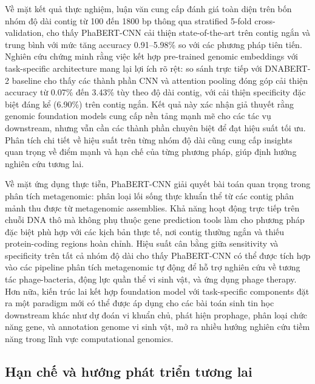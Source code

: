 Về mặt kết quả thực nghiệm, luận văn cung cấp đánh giá toàn diện trên bốn nhóm độ dài contig từ 100 đến 1800 bp thông qua stratified 5-fold cross-validation, cho thấy PhaBERT-CNN cải thiện state-of-the-art trên contig ngắn và trung bình với mức tăng accuracy 0.91--5.98\% so với các phương pháp tiên tiến. Nghiên cứu chứng minh rằng việc kết hợp pre-trained genomic embeddings với task-specific architecture mang lại lợi ích rõ rệt: so sánh trực tiếp với DNABERT-2 baseline cho thấy các thành phần CNN và attention pooling đóng góp cải thiện accuracy từ 0.07\% đến 3.43\% tùy theo độ dài contig, với cải thiện specificity đặc biệt đáng kể (6.90\%) trên contig ngắn. Kết quả này xác nhận giả thuyết rằng genomic foundation models cung cấp nền tảng mạnh mẽ cho các tác vụ downstream, nhưng vẫn cần các thành phần chuyên biệt để đạt hiệu suất tối ưu. Phân tích chi tiết về hiệu suất trên từng nhóm độ dài cũng cung cấp insights quan trọng về điểm mạnh và hạn chế của từng phương pháp, giúp định hướng nghiên cứu tương lai.

Về mặt ứng dụng thực tiễn, PhaBERT-CNN giải quyết bài toán quan trọng trong phân tích metagenomic: phân loại lối sống thực khuẩn thể từ các contig phân mảnh thu được từ metagenomic assemblies. Khả năng hoạt động trực tiếp trên chuỗi DNA thô mà không phụ thuộc gene prediction tools làm cho phương pháp đặc biệt phù hợp với các kịch bản thực tế, nơi contig thường ngắn và thiếu protein-coding regions hoàn chỉnh. Hiệu suất cân bằng giữa sensitivity và specificity trên tất cả nhóm độ dài cho thấy PhaBERT-CNN có thể được tích hợp vào các pipeline phân tích metagenomic tự động để hỗ trợ nghiên cứu về tương tác phage-bacteria, động lực quần thể vi sinh vật, và ứng dụng phage therapy. Hơn nữa, kiến trúc lai kết hợp foundation model với task-specific components đặt ra một paradigm mới có thể được áp dụng cho các bài toán sinh tin học downstream khác như dự đoán vi khuẩn chủ, phát hiện prophage, phân loại chức năng gene, và annotation genome vi sinh vật, mở ra nhiều hướng nghiên cứu tiềm năng trong lĩnh vực computational genomics.

\subsection{Hạn chế và hướng phát triển tương lai}
\label{sec:limitations_future}

